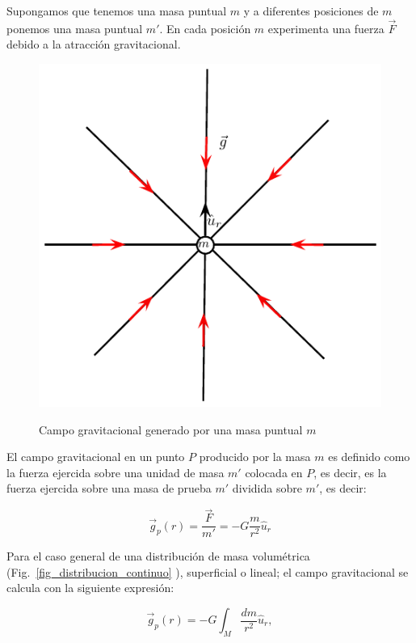 Supongamos que tenemos una masa puntual $m$ y a diferentes posiciones de $m$ ponemos una masa puntual $m'$. En cada posición $m$ experimenta una fuerza $\vec{F}$ debido a la atracción gravitacional.

\begin{figure}[h]
\begin{center}
\includegraphics[scale=0.8]{gravitacion/campo}
\label{campo}
\end{center}
\caption{Campo gravitacional generado por una masa puntual $m$}
\end{figure}

El campo gravitacional en un punto $P$ producido por la masa $m$ es definido como la fuerza ejercida sobre una unidad de masa $m'$ colocada en $P$, es decir, es la fuerza ejercida sobre una masa de prueba $m'$ dividida sobre $m'$, es decir:

\begin{equation}
\boxed{
\vec{g}_p(r)=\dfrac{\vec{F}}{m'}=-G\dfrac{m}{r^2}\hat{u}_r
}
\end{equation}     

Para el caso general de una distribución de masa volumétrica (Fig.~\ref{fig_distribucion_continuo} ), superficial o lineal; el campo gravitacional se calcula con la siguiente expresión:

\begin{equation}
\boxed{\vec{g}_p(r)=-G\int_M \dfrac{dm}{r^2}\hat{u}_r} ,
\label{ecucampogcontinuo}
\end{equation} 

